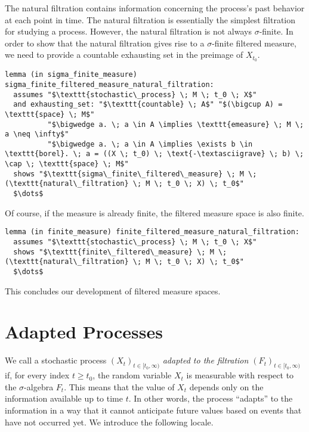The natural filtration contains information concerning the process's past behavior at each point in time. The natural filtration is essentially the simplest filtration for studying a process. However, the natural filtration is not always $\sigma$-finite. In order to show that the natural filtration gives rise to a $\sigma$-finite filtered measure, we need to provide a countable exhausting set in the preimage of $X_{t_0}$.

\begin{isalemma}
{\small
\begin{lstlisting}[style=isabelle]
lemma (in sigma_finite_measure) sigma_finite_filtered_measure_natural_filtration:
  assumes "$\texttt{stochastic\_process} \; M \; t_0 \; X$"
  and exhausting_set: "$\texttt{countable} \; A$" "$(\bigcup A) = \texttt{space} \; M$" 
		  "$\bigwedge a. \; a \in A \implies \texttt{emeasure} \; M \; a \neq \infty$" 
		  "$\bigwedge a. \; a \in A \implies \exists b \in \texttt{borel}. \; a = ((X \; t_0) \; \text{-\textasciigrave} \; b) \; \cap \; \texttt{space} \; M$"
  shows "$\texttt{sigma\_finite\_filtered\_measure} \; M \; (\texttt{natural\_filtration} \; M \; t_0 \; X) \; t_0$"
  $\dots$
\end{lstlisting}
}
\end{isalemma}

Of course, if the measure is already finite, the filtered measure space is also finite.

\begin{isalemma}
{\small
\begin{lstlisting}[style=isabelle]
lemma (in finite_measure) finite_filtered_measure_natural_filtration:
  assumes "$\texttt{stochastic\_process} \; M \; t_0 \; X$"
  shows "$\texttt{finite\_filtered\_measure} \; M \; (\texttt{natural\_filtration} \; M \; t_0 \; X) \; t_0$"
  $\dots$
\end{lstlisting}
}
\end{isalemma}

This concludes our development of filtered measure spaces.

\section{Adapted Processes}

We call a stochastic process $(X_t)_{t \in [t_0, \infty)}$ \textit{adapted to the filtration $(F_t)_{t \in [t_0, \infty)}$} if, for every index $t \ge t_0$, the random variable $X_t$ is measurable with respect to the $\sigma$-algebra $F_t$. This means that the value of $X_t$ depends only on the information available up to time $t$. In other words, the process ``adapts'' to the information in a way that it cannot anticipate future values based on events that have not occurred yet. We introduce the following locale.

